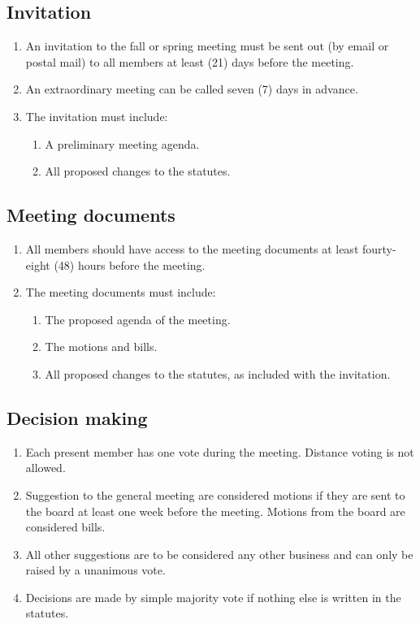 \subsection{Invitation} \label{sec:meetingInvitation}
\begin{enumerate}
  \item An invitation to the fall or spring meeting must be sent out (by email or postal mail) to all members at least (21) days before the meeting.
  \item An extraordinary meeting can be called seven (7) days in advance. 
  \item The invitation must include:
  \begin{enumerate}
    \item A preliminary meeting agenda.
    \item All proposed changes to the statutes.
  \end{enumerate}
\end{enumerate}

\subsection{Meeting documents} \label{sec:regMeetingDocs}
\begin{enumerate}
  \item All members should have access to the meeting documents at least fourty-eight (48) hours before the meeting. 
  \item The meeting documents must include:
  \begin{enumerate}
    \item The proposed agenda of the meeting.
    \item The motions and bills.
    \item All proposed changes to the statutes, as included with the invitation.
  \end{enumerate}
\end{enumerate}

\subsection{Decision making}
\begin{enumerate}
  \item Each present member has one vote during the meeting. Distance voting is not allowed.
  \item Suggestion to the general meeting are considered motions if they are sent to the board at least one week before the meeting. Motions from the board are considered bills.
  \item All other suggestions are to be considered any other business and can only be raised by a unanimous vote.
  \item Decisions are made by simple majority vote if nothing else is written in the statutes. 
\end{enumerate}
